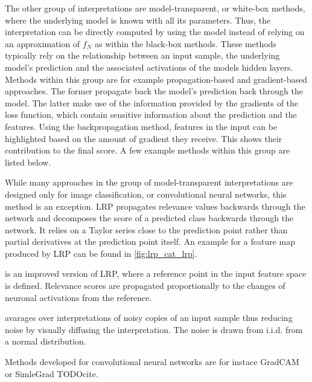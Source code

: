 The other group of interpretations are model-transparent, or white-box methods, where the underlying model is known with all its parameters. Thus, the interpretation can be directly computed by using the model instead of relying on an approximation of $f_N$ as within the black-box methods. These methods typically rely on the relationship between an input sample, the underlying model's prediction and the associated activations of the models hidden layers. Methods within this group are for example propagation-based and gradient-based approaches. The former propagate back the model's prediction back through the model. The latter make use of the information provided by the gradients of the loss function, which contain sensitive information about the prediction and the features. Using the backpropagation method, features in the input can be highlighted based on the amount of gradient they receive. This shows their contribution to the final score. 
A few example methods within this group are listed below. 

 While many approaches in the group of model-transparent interpretations are designed only for image classification, or convolutional neural networks, this method \cite{bach2015pixel} is an exception. LRP propagates relevance values backwards through the network and decomposes the score of a predicted class backwards through the network. It relies on a Taylor series close to the prediction point rather than partial derivatives at the prediction point itself. An example for a feature map produced by LRP can be found in \autoref{fig:lrp_cat_lrp}.

 \cite{shrikumar2017learning} is an improved version of LRP, where a reference point in the input feature space is defined. Relevance scores are propagated proportionally to the changes of neuronal activations from the reference. %

 \cite{smilkov2017smoothgrad} avarages over interpretations of noisy copies of an input sample thus reducing noise by visually diffusing the interpretation. The noise is drawn from i.i.d. from a normal distribution. 

Methods developed for convolutional neural networks are for instace GradCAM \cite{selvaraju2017grad} or SimleGrad TODOcite. 


